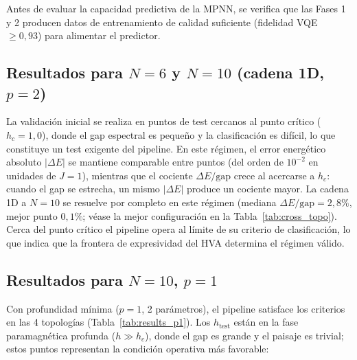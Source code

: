 \documentclass[11pt,a4paper,spanish]{book}
\begin{document}
Antes de evaluar la capacidad predictiva de la MPNN, se verifica que las Fases 1 y 2 producen datos de entrenamiento de calidad suficiente (fidelidad VQE $\geq 0,93$) para alimentar el predictor.

\subsection{Resultados para $N = 6$ y $N = 10$ (cadena 1D, $p = 2$)}

La validación inicial se realiza en puntos de test cercanos al punto crítico ($h_c = 1,0$), donde el gap espectral es pequeño y la clasificación es difícil, lo que constituye un test exigente del pipeline. En este régimen, el error energético absoluto $|\Delta E|$ se mantiene comparable entre puntos (del orden de $10^{-2}$ en unidades de $J = 1$), mientras que el cociente $\Delta E/\text{gap}$ crece al acercarse a $h_c$: cuando el gap se estrecha, un mismo $|\Delta E|$ produce un cociente mayor. La cadena 1D a $N = 10$ se resuelve por completo en este régimen (mediana $\Delta E/\text{gap} = 2{,}8\%$, mejor punto $0{,}1\%$; véase la mejor configuración en la Tabla~\ref{tab:cross_topo}). Cerca del punto crítico el pipeline opera al límite de su criterio de clasificación, lo que indica que la frontera de expresividad del HVA determina el régimen válido.

\subsection{Resultados para $N = 10$, $p = 1$}

Con profundidad mínima ($p = 1$, 2 parámetros), el pipeline satisface los criterios en las 4 topologías (Tabla~\ref{tab:results_p1}). Los $h_{\text{test}}$ están en la fase paramagnética profunda ($h \gg h_c$), donde el gap es grande y el paisaje es trivial; estos puntos representan la condición operativa más favorable:
\end{document}
